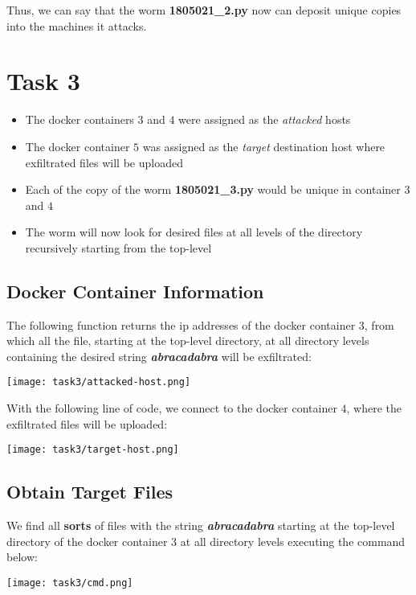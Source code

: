 \documentclass{article}
\begin{document}
Thus, we can say that the worm \textbf{1805021\_2.py} now can deposit unique copies into the machines it attacks.


\section{Task 3}
 \begin{itemize}
     \item The docker containers $3$ and $4$ were assigned as the \textit{attacked} hosts
     \item The docker container $5$ was assigned as the \textit{target} destination host where exfiltrated files will be uploaded
     \item Each of the copy of the worm \textbf{1805021\_3.py} would be unique in container $3$ and $4$
     \item The worm will now look for desired files at all levels of the directory recursively starting from the top-level
 \end{itemize}

  \subsection{Docker Container Information}
 The following function returns the ip addresses of the docker container $3$, from which all the file, starting at the top-level directory, at all directory levels containing the desired string \textbf{\textit{abracadabra}} will be exfiltrated:
\begin{center}
    \texttt{[image: task3/attacked-host.png]}
\end{center}

With the following line of code, we connect to the docker container $4$, where the exfiltrated files will be uploaded:
\begin{center}
    \texttt{[image: task3/target-host.png]}
\end{center}


\subsection{Obtain Target Files}
We find all \textbf{sorts} of files with the string \textbf{\textit{abracadabra}} starting at the top-level directory of the docker container $3$ at all directory levels executing the command below:
\begin{center}
    \texttt{[image: task3/cmd.png]}
\end{center}
\end{document}
